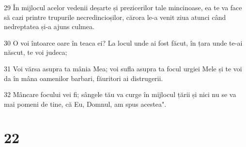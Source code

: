 \par 29 În mijlocul acelor vedenii deșarte și prezicerilor tale mincinoase, ea te va face să cazi printre trupurile necredincioșilor, cărora le-a venit ziua atunci când nedreptatea și-a ajuns culmea.
\par 30 O voi întoarce oare în teaca ei? La locul unde ai fost făcut, în țara unde te-ai născut, te voi judeca;
\par 31 Voi vărsa asupra ta mânia Mea; voi sufla asupra ta focul urgiei Mele și te voi da în mâna oamenilor barbari, făuritori ai distrugerii.
\par 32 Mâncare focului vei fi; sângele tău va curge în mijlocul țării și nici nu se va mai pomeni de tine, că Eu, Domnul, am spus acestea".

\chapter{22}


